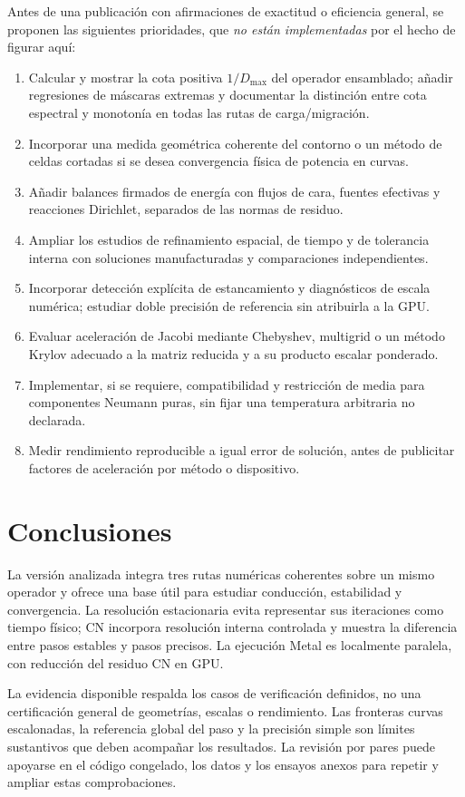 \documentclass[11pt,a4paper]{article}
\begin{document}
Antes de una publicación con afirmaciones de exactitud o eficiencia general,
se proponen las siguientes prioridades, que \emph{no están implementadas} por
el hecho de figurar aquí:
\begin{enumerate}
\item Calcular y mostrar la cota positiva $1/D_{\max}$ del operador ensamblado;
añadir regresiones de máscaras extremas y documentar la distinción entre cota
espectral y monotonía en todas las rutas de carga/migración.
\item Incorporar una medida geométrica coherente del contorno o un método de
celdas cortadas si se desea convergencia física de potencia en curvas.
\item Añadir balances firmados de energía con flujos de cara, fuentes efectivas
y reacciones Dirichlet, separados de las normas de residuo.
\item Ampliar los estudios de refinamiento espacial, de tiempo y de tolerancia
interna con soluciones manufacturadas y comparaciones independientes.
\item Incorporar detección explícita de estancamiento y diagnósticos de escala
numérica; estudiar doble precisión de referencia sin atribuirla a la GPU.
\item Evaluar aceleración de Jacobi mediante Chebyshev, multigrid o un método
Krylov adecuado a la matriz reducida y a su producto escalar ponderado.
\item Implementar, si se requiere, compatibilidad y restricción de media para
componentes Neumann puras, sin fijar una temperatura arbitraria no declarada.
\item Medir rendimiento reproducible a igual error de solución, antes de
publicitar factores de aceleración por método o dispositivo.
\end{enumerate}

\section{Conclusiones}
La versión analizada integra tres rutas numéricas coherentes sobre un mismo
operador y ofrece una base útil para estudiar conducción, estabilidad y
convergencia. La resolución estacionaria evita representar sus iteraciones
como tiempo físico; CN incorpora resolución interna controlada y muestra
la diferencia entre pasos estables y pasos precisos. La ejecución Metal es
localmente paralela, con reducción del residuo CN en GPU.

La evidencia disponible respalda los casos de verificación definidos, no una
certificación general de geometrías, escalas o rendimiento. Las fronteras
curvas escalonadas, la referencia global del paso y la precisión simple son
límites sustantivos que deben acompañar los resultados. La revisión por pares
puede apoyarse en el código congelado, los datos y los ensayos anexos para
repetir y ampliar estas comprobaciones.
\end{document}
